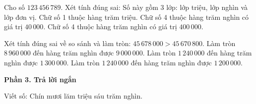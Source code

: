 \begin{ex} %
Cho số $123\,456\,789$. Xét tính đúng sai:
\choiceTF
{\True Số này gồm 3 lớp: lớp triệu, lớp nghìn và lớp đơn vị.}
{\True Chữ số 1 thuộc hàng trăm triệu.}
{Chữ số 4 thuộc hàng trăm nghìn có giá trị $40\,000$.}
{\True Chữ số 4 thuộc hàng trăm nghìn có giá trị $400\,000$.}
\end{ex}

\begin{ex} %
Xét tính đúng sai về so sánh và làm tròn:
\choiceTF
{\True $45\,678\,000 > 45\,670\,800$.}
{\True Làm tròn $8\,960\,000$ đến hàng trăm nghìn được $9\,000\,000$.}
{Làm tròn $1\,240\,000$ đến hàng trăm nghìn được $1\,300\,000$.}
{\True Làm tròn $1\,240\,000$ đến hàng trăm nghìn được $1\,200\,000$.}
\end{ex}

\textbf{Phần 3. Trả lời ngắn}

\begin{ex} %
Viết số: Chín mươi lăm triệu sáu trăm nghìn.
\end{ex}

